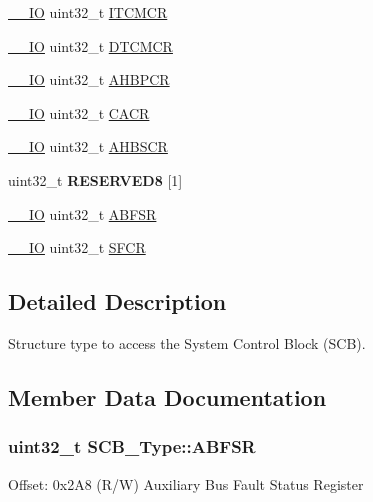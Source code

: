 \begin{DoxyCompactItemize}
\item 
\hyperlink{core__sc300_8h_aec43007d9998a0a0e01faede4133d6be}{\+\_\+\+\_\+\+IO} uint32\+\_\+t \hyperlink{structSCB__Type_a6f52bb11b40cad59e836366a43686d63}{I\+T\+C\+M\+CR}
\item 
\hyperlink{core__sc300_8h_aec43007d9998a0a0e01faede4133d6be}{\+\_\+\+\_\+\+IO} uint32\+\_\+t \hyperlink{structSCB__Type_a1728cb36883856a3543286d9acfb8a0d}{D\+T\+C\+M\+CR}
\item 
\hyperlink{core__sc300_8h_aec43007d9998a0a0e01faede4133d6be}{\+\_\+\+\_\+\+IO} uint32\+\_\+t \hyperlink{structSCB__Type_aa7154549803e08073983216c159f74e3}{A\+H\+B\+P\+CR}
\item 
\hyperlink{core__sc300_8h_aec43007d9998a0a0e01faede4133d6be}{\+\_\+\+\_\+\+IO} uint32\+\_\+t \hyperlink{structSCB__Type_acc2c89b1b03bed0224952b05582ce397}{C\+A\+CR}
\item 
\hyperlink{core__sc300_8h_aec43007d9998a0a0e01faede4133d6be}{\+\_\+\+\_\+\+IO} uint32\+\_\+t \hyperlink{structSCB__Type_ae1aa2246b75741ae5a7a965a66fa8d64}{A\+H\+B\+S\+CR}
\item 
uint32\+\_\+t {\bfseries R\+E\+S\+E\+R\+V\+E\+D8} \mbox{[}1\mbox{]}\hypertarget{structSCB__Type_ab5acfe05b4c0828572919ef4e4e2de75}{}\label{structSCB__Type_ab5acfe05b4c0828572919ef4e4e2de75}

\item 
\hyperlink{core__sc300_8h_aec43007d9998a0a0e01faede4133d6be}{\+\_\+\+\_\+\+IO} uint32\+\_\+t \hyperlink{structSCB__Type_acb77619057d99c6d671915df3aa9b454}{A\+B\+F\+SR}
\item 
\hyperlink{core__sc300_8h_aec43007d9998a0a0e01faede4133d6be}{\+\_\+\+\_\+\+IO} uint32\+\_\+t \hyperlink{structSCB__Type_a00ae0f2f224605dc8980a19d7624e533}{S\+F\+CR}
\end{DoxyCompactItemize}


\subsection{Detailed Description}
Structure type to access the System Control Block (S\+CB). 

\subsection{Member Data Documentation}
\subsubsection[{\texorpdfstring{A\+B\+F\+SR}{ABFSR}}]{ uint32\+\_\+t S\+C\+B\+\_\+\+Type\+::\+A\+B\+F\+SR}\hypertarget{structSCB__Type_acb77619057d99c6d671915df3aa9b454}{}\label{structSCB__Type_acb77619057d99c6d671915df3aa9b454}
Offset\+: 0x2\+A8 (R/W) Auxiliary Bus Fault Status Register 
